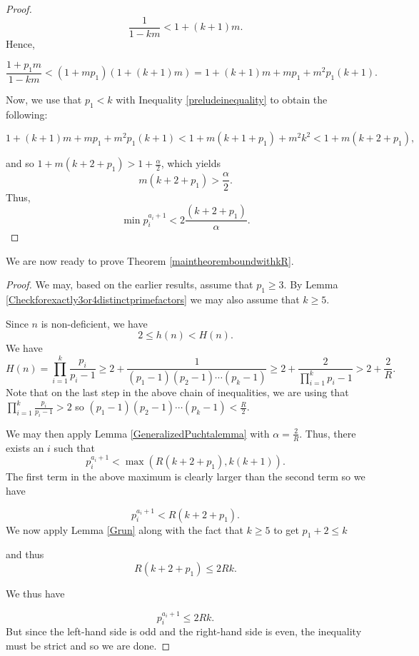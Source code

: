 \documentclass[12pt,reqno]{article}
\theoremstyle{plain}
\theoremstyle{definition}
\theoremstyle{remark}
\begin{document}
\begin{proof}
$$\frac{1}{1-km} < 1 + (k+1)m.$$
Hence,

\begin{equation}\frac{1+p_1m}{1-km} < (1+ mp_1)( 1 + (k+1)m) = 1 + (k+1)m + mp_1 + m^2p_1(k+1). \label{preludeinequality} \end{equation}

Now, we use that $p_1 < k$  with Inequality \eqref{preludeinequality} to obtain the following:

$$1 + (k+1)m + mp_1 + m^2p_1(k+1) < 1 + m(k+1+p_1) + m^2k^2 < 1 + m(k + 2 +p_1),$$

and so $1 + m(k + 2 +p_1) > 1+ \frac{\alpha}{2} $,
which yields$$ m(k + 2 +p_1) > \frac{\alpha}{2}. $$
Thus, 
 \begin{equation}\label{copyofstrongermininequalityinlemmaform} \min p_i^{a_i+1} < 2\frac{(k+2+p_1)}{\alpha }.\end{equation}
 
\end{proof}

We are now ready to prove Theorem \ref{maintheoremboundwithkR}.
\begin{proof}
 We may, based on the earlier results, assume that $p_1 \geq 3$. By Lemma \ref{Checkforexactly3or4distinctprimefactors} we may also assume that $k \geq 5$.
 
 Since $n$ is non-deficient, we have 
$$2 \leq h(n) < H(n).$$
We have $$H(n) = \prod_{i=1}^k \frac{p_i}{p_i -1}  \geq 2 + \frac{1}{(p_1-1)(p_2-1) \cdots (p_k-1)} \geq 2 + \frac{2}{\prod_{i=1}^k p_i-1} > 2 + \frac{2}{R}.$$  
Note that on the last step in the above chain of inequalities, we are using that $\prod_{i=1}^k \frac{p_i}{p_i-1} >2 $ so $(p_1-1)(p_2-1) \cdots (p_k-1) < \frac{R}{2}$.

We may then apply Lemma  \ref{GeneralizedPuchtalemma} with $\alpha = \frac{2}{R}$. Thus, there exists an $i$ such that  \begin{equation}\label{copyofstrongermininequalitywithmaxterm} p_i^{a_i+1} < \max (R(k+2+p_1), k(k+1)).\end{equation}
The first term in the above maximum is clearly larger than the second term  so we have 

\begin{equation}\label{copyofstrongermininequalitywithoutmaxterm} p_i^{a_i+1} < R(k+2+p_1).\end{equation}
We now apply Lemma \ref{Grun} along with the fact that $k \geq 5$ to get
$p_1 +2 \leq k$ 

and thus $$R(k+2+p_1) \leq 2Rk. $$

We thus have 

$$p_i^{a_i+1} \leq 2Rk.$$ But  since the left-hand side is odd and the right-hand side is even, the inequality must be strict and so we are done.
\end{proof}
\end{document}
